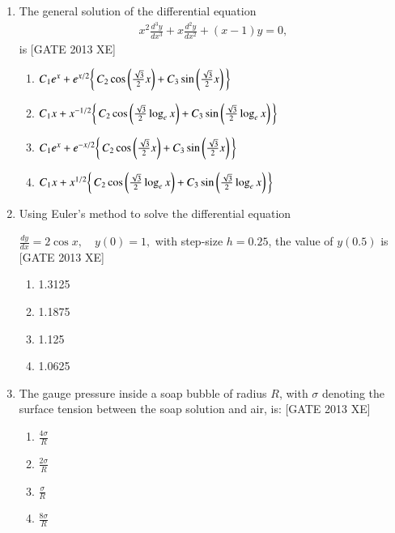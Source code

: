 \documentclass[journal,12pt,onecolumn]{IEEEtran}
\theoremstyle{remark}
\begin{document}
\begin{enumerate}
\begin{multicols}{4}
\begin{enumerate}
\item 0
\item $\frac{1}{6}$
\item $\frac{1}{3}$
\item $\frac{5}{3}$
\end{enumerate}
\end{multicols}

\item The general solution of the differential equation
\begin{align}
x^2 \frac{d^3 y}{dx^3} + x \frac{d^2 y}{dx^2} + (x - 1)y = 0, 
\end{align}
is  \hfill[GATE 2013 XE]

\begin{multicols}{2}
\begin{enumerate}
\item $C_{1}e^{x}+e^{x/2}\!\left\{\,C_{2}\cos\left(\tfrac{\sqrt{3}}{2}x\right)+C_{3}\sin\left(\tfrac{\sqrt{3}}{2}x\right)\,\right\}$
    \item $C_{1}x+x^{-1/2}\!\left\{\,C_{2}\cos\left(\tfrac{\sqrt{3}}{2}\log_{e}x\right)+C_{3}\sin\left(\tfrac{\sqrt{3}}{2}\log_{e}x\right)\,\right\}$
    \item $C_{1}e^{x}+e^{-x/2}\!\left\{\,C_{2}\cos\left(\tfrac{\sqrt{3}}{2}x\right)+C_{3}\sin\left(\tfrac{\sqrt{3}}{2}x\right)\,\right\}$
    \item $C_{1}x+x^{1/2}\!\left\{\,C_{2}\cos\left(\tfrac{\sqrt{3}}{2}\log_{e}x\right)+C_{3}\sin\left(\tfrac{\sqrt{3}}{2}\log_{e}x\right)\,\right\}$
\end{enumerate}
\end{multicols}

\item Using Euler’s method to solve the differential equation

$
\frac{dy}{dx} = 2 \cos x, \quad y(0) = 1,
$
with step-size $h=0.25$, the value of $y(0.5)$ is  \hfill[GATE 2013 XE]

\begin{multicols}{4}
\begin{enumerate}
\item 1.3125
\item 1.1875
\item 1.125
\item 1.0625
\end{enumerate}
\end{multicols}
\item The gauge pressure inside a soap bubble of radius $R$, with $\sigma$ denoting the surface tension between the soap solution and air, is: \hfill[GATE 2013 XE]
\begin{multicols}{2}
\begin{enumerate}
    \item $\frac{4\sigma}{R}$
    \item $\frac{2\sigma}{R}$
    \item $\frac{\sigma}{R}$
    \item $\frac{8\sigma}{R}$
\end{enumerate}
\end{multicols}


\end{enumerate}
\end{document}
